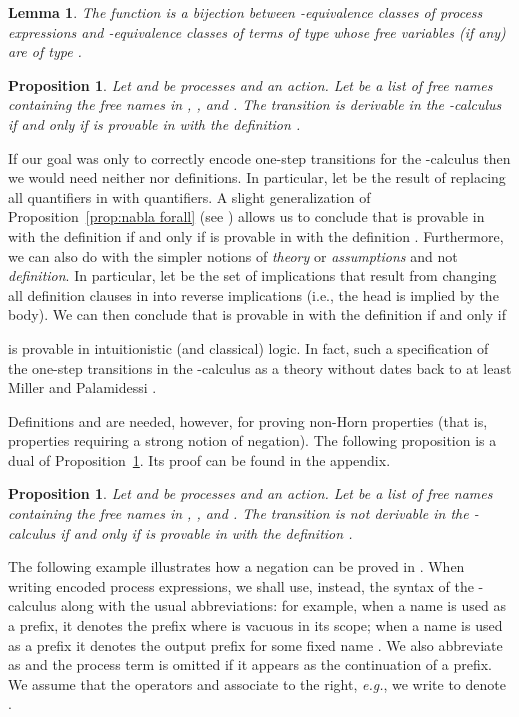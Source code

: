 \documentclass{acmtrans2m}
\newtheorem{lemma}[theorem]{Lemma}
\newtheorem{proposition}[theorem]{Proposition}
\begin{document}
\begin{lemma}
\label{lemma: adequacy}
The function  is a bijection between -equivalence
classes of process expressions and -equivalence classes of
terms of type  whose free variables (if any) are of type .
\end{lemma}

\begin{proposition}
\label{prop:one step}
Let  and  be processes and  an action. Let  be
a list of free names containing the free names in , , and .
The transition  is derivable in the -calculus if and only
if  is provable 
in  with the definition .
\end{proposition}

If our goal was only to correctly encode one-step transitions for the
-calculus then we would need neither  nor definitions.
In particular, let  be the result of replacing
all  quantifiers in  with  quantifiers.
A slight generalization of Proposition~\ref{prop:nabla forall} (see
\cite{miller05tocl,tiu04phd}) allows us to conclude that
 is provable 
in  with the definition  if and only if
 is provable 
in  with the definition .  Furthermore, we
can also do with the simpler notions of {\em theory} or {\em
assumptions} and not {\em definition}.  In particular, let  be the set of implications that result from changing all
definition clauses in  into reverse implications
(i.e., the head is implied by the body).  We can then conclude that
 is provable 
in  with the definition  if and only if 
 
is provable in intuitionistic (and classical) logic.  In fact, such a specification 
of the one-step transitions in the -calculus as a theory without  dates
back to at least Miller and Palamidessi \citeyear{miller99surveys}.


Definitions and  are needed, however, for proving non-Horn
properties (that is, properties requiring a strong notion of
negation).  The following proposition is a dual of
Proposition~\ref{prop:one step}. Its proof can be found in the appendix.

\begin{proposition}
\label{prop:neg one step}
Let  and  be processes and  an action.   Let  be
a list of free names containing the free names in , , and .
The transition  is not derivable in the -calculus if and only
if  is provable 
in  with the definition .
\end{proposition}


The following example illustrates how a negation can be proved in
.  When writing encoded process expressions, we shall use,
instead, the syntax of the -calculus along with the usual
abbreviations: for example, when a name  is used as a prefix, it
denotes the prefix  where  is vacuous in its scope; when a
name  is used as a prefix it denotes the output prefix
 for some fixed name .  We also abbreviate
 as  and the process term  is omitted
if it appears as the continuation of a prefix. We assume that the
operators  and  associate to the right, {\em e.g.}, we write 
to denote .
\end{document}
